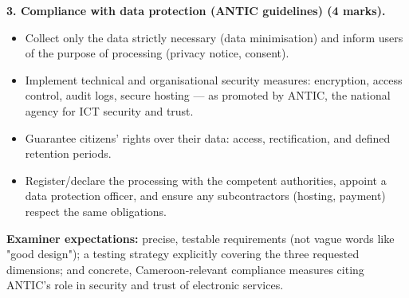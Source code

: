 \documentclass[11pt]{article}
\begin{document}
\begin{corrige}
\textbf{3. Compliance with data protection (ANTIC guidelines) (4 marks).}
\begin{itemize}
\item Collect only the data strictly necessary (data minimisation) and inform users of the purpose of processing (privacy notice, consent).
\item Implement technical and organisational security measures: encryption, access control, audit logs, secure hosting — as promoted by ANTIC, the national agency for ICT security and trust.
\item Guarantee citizens' rights over their data: access, rectification, and defined retention periods.
\item Register/declare the processing with the competent authorities, appoint a data protection officer, and ensure any subcontractors (hosting, payment) respect the same obligations.
\end{itemize}

\textbf{Examiner expectations:} precise, testable requirements (not vague words like "good design"); a testing strategy explicitly covering the three requested dimensions; and concrete, Cameroon‑relevant compliance measures citing ANTIC's role in security and trust of electronic services.
\end{corrige}
\end{document}
